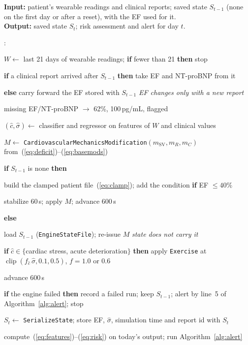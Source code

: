 \documentclass[conference]{IEEEtran}
\newcounter{algline}
\newenvironment{algsteps}{\begin{list}{\scriptsize\arabic{algline}:}{\usecounter{algline}\setlength{\leftmargin}{1.7em}\setlength{\labelwidth}{1.3em}\setlength{\labelsep}{0.4em}\setlength{\itemsep}{0pt}\setlength{\parsep}{0pt}\setlength{\topsep}{2pt}\setlength{\partopsep}{0pt}}}{\end{list}}
\newcommand{\kw}[1]{\textbf{#1}}
\newcommand{\Ind}{\hspace*{1em}}
\newcommand{\code}[1]{\texttt{\footnotesize #1}}
\begin{document}
\begin{algorithm}[!t]
\caption{One day of the continuous-state twin (\code{run\_daily\_continuous\_pipeline})}
\label{alg:continuous}
\footnotesize
\textbf{Input:} patient's wearable readings and clinical reports; saved state $S_{t-1}$ (none on the first day or after a reset), with the EF used for it.\\
\textbf{Output:} saved state $S_t$; risk assessment and alert for day $t$.
\begin{algsteps}
\item $W\leftarrow$ last 21 days of wearable readings; \kw{if} fewer than 21 \kw{then} stop
\item \kw{if} a clinical report arrived after $S_{t-1}$ \kw{then} take EF and NT-proBNP from it
\item \kw{else} carry forward the EF stored with $S_{t-1}$ \hfill\textit{EF changes only with a new report}
\item \Ind missing EF/NT-proBNP $\rightarrow$ 62\%, 100\,pg/mL, flagged
\item $(\hat c,\hat\sigma)\leftarrow$ classifier and regressor on features of $W$ and clinical values
\item $M\leftarrow$ \code{CardiovascularMechanicsModification}$(m_{\text{SV}},m_R,m_C)$ from~(\ref{eq:deficit})--(\ref{eq:basemods})
\item \kw{if} $S_{t-1}$ is none \kw{then}
\item \Ind build the clamped patient file~(\ref{eq:clamp}); add the condition \kw{if} EF $\le40\%$
\item \Ind stabilize 60\,s; apply $M$; advance 600\,s
\item \kw{else}
\item \Ind load $S_{t-1}$ (\code{EngineStateFile}); re-issue $M$ \hfill\textit{state does not carry it}
\item \Ind \kw{if} $\hat c\in\{$cardiac stress, acute deterioration$\}$ \kw{then} apply \code{Exercise} at $\operatorname{clip}(f_{\hat c}\,\hat\sigma,0.1,0.5)$, $f=1.0$ or $0.6$
\item \Ind advance 600\,s
\item \kw{if} the engine failed \kw{then} record a failed run; keep $S_{t-1}$; alert by line~5 of Algorithm~\ref{alg:alert}; stop
\item $S_t\leftarrow$ \code{SerializeState}; store EF, $\hat\sigma$, simulation time and report id with $S_t$
\item compute~(\ref{eq:features})--(\ref{eq:risk}) on today's output; run Algorithm~\ref{alg:alert}
\end{algsteps}
\end{algorithm}
\end{document}
